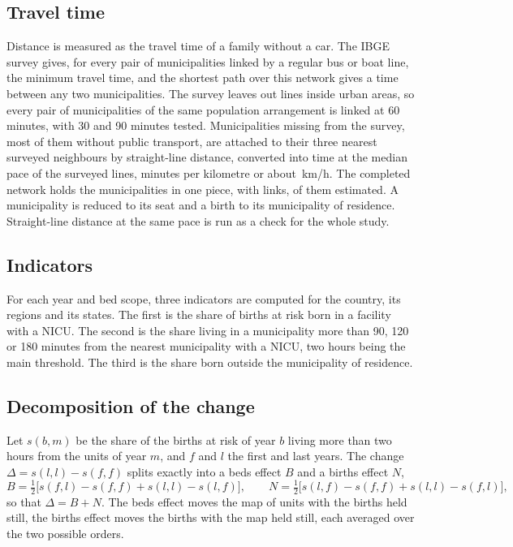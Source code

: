 \documentclass[11pt,a4paper]{article}
\begin{document}
\subsection{Travel time}
Distance is measured as the travel time of a family without a car. The IBGE
survey gives, for every pair of municipalities linked by a regular bus or boat
line, the minimum travel time, and the shortest path over this network gives a
time between any two municipalities. The survey leaves out lines inside urban
areas, so every pair of municipalities of the same population arrangement is
linked at 60 minutes, with 30 and 90 minutes tested. Municipalities missing from
the survey, most of them without public transport, are attached to their three
nearest surveyed neighbours by straight-line distance, converted into time at the
median pace of the surveyed lines, \pace{} minutes per kilometre or about
\speed\,km/h. The completed network holds the \netMunicipalities{}
municipalities in one piece, with \netLinks{} links, \netEstimated{} of them
estimated. A municipality is reduced to its seat and a birth to its municipality
of residence. Straight-line distance at the same pace is run as a check for the
whole study.

\subsection{Indicators}
For each year and bed scope, three indicators are computed for the country, its
regions and its states. The first is the share of births at risk born in a
facility with a NICU. The second is the share living in a municipality more than
90, 120 or 180 minutes from the nearest municipality with a NICU, two hours being
the main threshold. The third is the share born outside the municipality of
residence.

\subsection{Decomposition of the change}
Let $s(b, m)$ be the share of the births at risk of year $b$ living more than two
hours from the units of year $m$, and $f$ and $l$ the first and last years. The
change $\Delta = s(l,l) - s(f,f)$ splits exactly into a beds effect $B$ and a
births effect $N$,
\[
B = \tfrac{1}{2}\big[s(f,l) - s(f,f) + s(l,l) - s(l,f)\big], \qquad
N = \tfrac{1}{2}\big[s(l,f) - s(f,f) + s(l,l) - s(f,l)\big],
\]
so that $\Delta = B + N$. The beds effect moves the map of units with the births
held still, the births effect moves the births with the map held still, each
averaged over the two possible orders.
\end{document}
